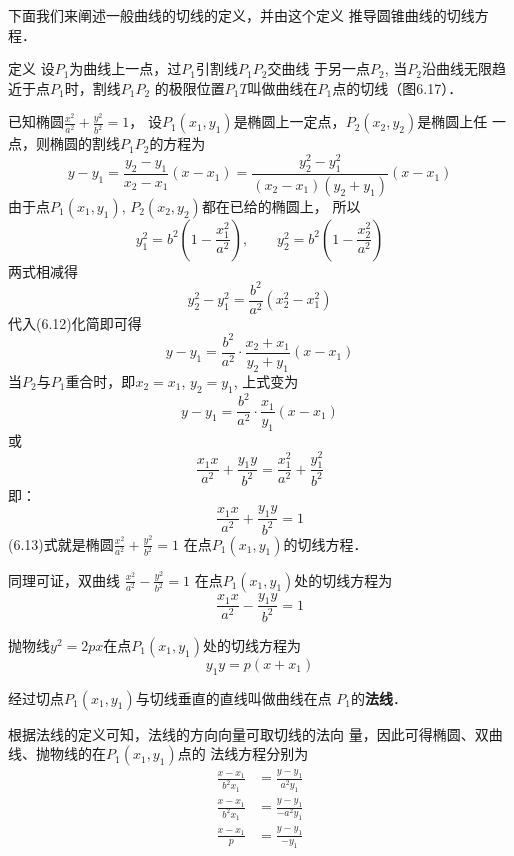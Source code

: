 下面我们来阐述一般曲线的切线的定义，并由这个定义
推导圆锥曲线的切线方程．

\begin{blk}
   {定义} 设$P_1$为曲线上一点，过$P_1$引割线$P_1P_2$交曲线
于另一点$P_2$, 当$P_2$沿曲线无限趋近于点$P_1$时，割线$P_1P_2$
的极限位置$P_1T$叫做曲线在$P_1$点的切线（图6.17）． 
\end{blk}

已知椭圆$\frac{x^2}{a^2}+\frac{y^2}{b^2}=1$，
设$P_1(x_1,y_1)$是椭圆上一定点，$P_2(x_2,y_2)$是椭圆上任
一点，则椭圆的割线$P_1P_2$的方程为
\begin{equation}
    y-y_1=\frac{y_2-y_1}{x_2-x_1}(x-x_1)=\frac{y^2_2-y^2_1}{(x_2-x_1)(y_2+y_1)}(x-x_1)
\end{equation}
由于点$P_1(x_1,y_1)$, $P_2(x_2,y_2)$都在已给的椭圆上，
所以
\[y^2_1=b^2\left(1-\frac{x^2_1}{a^2}\right),\qquad y^2_2=b^2\left(1-\frac{x^2_2}{a^2}\right)\]
两式相减得
\[y_2^2-y_1^2=\frac{b^2}{a^2}(x^2_2-x^2_1)\]
代入(6.12)化简即可得
\[y-y_1=\frac{b^2}{a^2}\cdot \frac{x_2+x_1}{y_2+y_1}(x-x_1)\]
当$P_2$与$P_1$重合时，即$x_2=x_1$, $y_2=y_1$, 上式变为
\[y-y_1=\frac{b^2}{a^2}\cdot \frac{x_1}{y_1}(x-x_1)\]
或
\[\frac{x_1x}{a^2}+\frac{y_1y}{b^2}=\frac{x_1^2}{a^2}+\frac{y_1^2}{b^2}\]
即：
\begin{equation}
    \boxed{\frac{x_1x}{a^2}+\frac{y_1y}{b^2}=1}
\end{equation}
(6.13)式就是椭圆$\frac{x^2}{a^2}+\frac{y^2}{b^2}=1$
在点$P_1(x_1,y_1)$的切线方程．

同理可证，双曲线
$\frac{x^2}{a^2}-\frac{y^2}{b^2}=1$
在点$P_1(x_1,y_1)$处的切线方程为
\begin{equation}
    \boxed{\frac{x_1x}{a^2}-\frac{y_1y}{b^2}=1}
\end{equation}

抛物线$y^2=2px$在点$P_1(x_1,y_1)$处的切线方程为
\begin{equation}
    \boxed{y_1y=p(x+x_1)}
\end{equation}

经过切点$P_1(x_1,y_1)$与切线垂直的直线叫做曲线在点
$P_1$的\textbf{法线}．

根据法线的定义可知，法线的方向向量可取切线的法向
量，因此可得椭圆、双曲线、抛物线的在$P_1(x_1,y_1)$点的
法线方程分别为
\begin{align}
    \frac{x-x_1}{b^2x_1}&=\frac{y-y_1}{a^2y_1}\\
    \frac{x-x_1}{b^2x_1}&=\frac{y-y_1}{-a^2y_1}\\
    \frac{x-x_1}{p}&=\frac{y-y_1}{-y_1}
\end{align}


